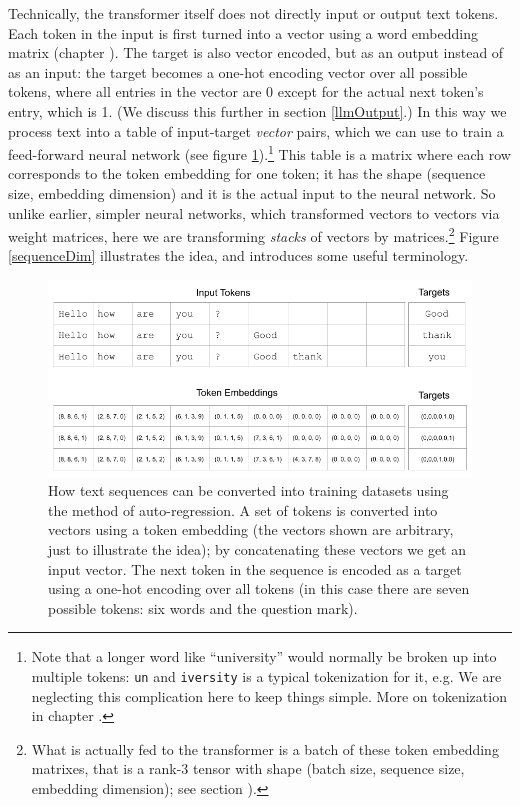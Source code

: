 Technically, the transformer itself does not directly input or output text
tokens. Each token in the input is first turned into a vector using a word
embedding matrix (chapter ). The target is also
vector encoded, but as an output instead of as an input: the target becomes a
one-hot encoding vector over all possible tokens, where all entries in the
vector are 0 except for the actual next token's entry, which is 1. (We discuss
this further in section \ref{llmOutput}.) In this way we process text into a
table of input-target \emph{vector} pairs, which we can use to train a
feed-forward neural network (see figure
\ref{nextWordPrediction}).\footnote{Note that a longer word like ``university''
would normally be broken up into multiple tokens: \texttt{un} and
\texttt{iversity} is a typical tokenization for it, e.g. We are neglecting this
complication here to keep things simple. More on tokenization in chapter
.} This table is a matrix where each row corresponds
to the token embedding for one token; it has the shape (sequence size,
embedding dimension) and it is the actual input to the neural network. So
unlike earlier, simpler neural networks, which transformed vectors to vectors
via weight matrices, here we are transforming \emph{stacks} of vectors by
matrices.\footnote{What is actually fed to the transformer is a batch of these
token embedding matrixes, that is a rank-3 tensor with shape (batch size,
sequence size, embedding dimension); see section ).}
Figure \ref{sequenceDim} illustrates the idea, and introduces some useful
terminology.

\begin{figure}[ht]
\centering
\includegraphics[scale=.45]{./images/contextWindow.png}
\caption[Jeff Yoshimi]{How text sequences can be converted into training
datasets using the method of auto-regression. A set of tokens is converted into
vectors using a token embedding (the vectors shown are arbitrary, just to
illustrate the idea); by concatenating these vectors we get an input vector.
The next token in the sequence is encoded as a target using a one-hot encoding
over all tokens (in this case there are seven possible tokens: six words and
the question mark).}
\label{nextWordPrediction}
\end{figure}

